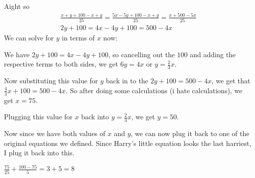 \documentclass[../mathproblems.tex]{subfiles}
\begin{document}
Aight so
\begin{align*} \frac{x+y+100-x+y}{25}=\frac{5x-5y+100-x+y}{25}=\frac{x+500-5x}{25}\\ 2y+100=4x-4y+100=500-4x \end{align*}We can solve for $y$ in terms of $x$ now:

We have $2y+100=4x-4y+100$, so cancelling out the $100$ and adding the respective terms to both sides, we get $6y=4x$ or $y=\frac{2}{3}x$.

Now substituting this value for $y$ back in to the $2y+100=500-4x$, we get that $\frac{4}{3}x+100=500-4x$. So after doing some calculations (i hate calculations), we get $x=75$.

Plugging this value for $x$ back into $y=\frac{2}{3}x$, we get $y=50$.

Now since we have both values of $x$ and $y$, we can now plug it back to one of the original equations we defined. Since Harry's little equation looks the last harriest, I plug it back into this.

$\frac{75}{25}+\frac{100-75}{5}=3+5 = \boxed{8}$

\noindent\hrulefill
\end{document}
